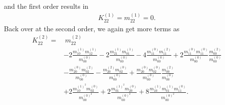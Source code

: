 and the first order results in
\begin{equation*}
  \begin{aligned}
    K_{22}^{(1)} = m_{22}^{(1)} =  0.
  \end{aligned}
\end{equation*}
Back over at the second order, we again get more terms as
\begin{equation*}
  \begin{aligned}
    K_{22}^{(2)}
    = &\
    m_{22}^{(2)}
    \\&
    - 2 \frac{ m_{10}^{(1)} m_{12}^{(1)} }{m_{00}^{(0)}}
    - 2 \frac{ m_{21}^{(1)} m_{01}^{(1)} }{m_{00}^{(0)}}
    - 4 \frac{ m_{11}^{(0)} m_{11}^{(2)} }{m_{00}^{(0)}}
    + 2 \frac{ m_{11}^{(0)} m_{11}^{(0)} }{m_{00}^{(0)}}\frac{ m_{00}^{(2)} }{m_{00}^{(0)}}
    \\&
    - \frac{ m_{20}^{(0)} m_{02}^{(2)} }{m_{00}^{(0)}}
    - \frac{ m_{20}^{(2)} m_{02}^{(0)} }{m_{00}^{(0)}}
    + \frac{ m_{20}^{(0)} m_{02}^{(0)} }{m_{00}^{(0)}}\frac{ m_{00}^{(2)} }{m_{00}^{(0)}}
    \\&
    + 2 \frac{ m_{10}^{{(1)}^2} m_{02}^{(0)} }{m_{00}^{{(0)}^2}}
    + 2 \frac{ m_{01}^{{(1)}^2} m_{20}^{(0)} }{m_{00}^{{(0)}^2}}
    + 8 \frac{ m_{10}^{(1)}m_{01}^{(1)} m_{11}^{(0)} }{m_{00}^{{(0)}^2}}.
  \end{aligned}
\end{equation*}

